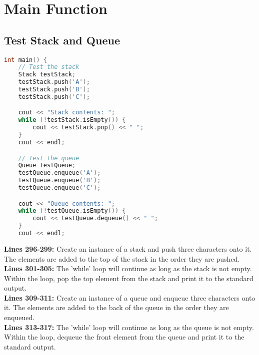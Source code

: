 \documentclass[letterpaper, 10pt,DIV=13]{scrartcl}
\numberwithin{equation}{section} %
\numberwithin{figure}{section} %
\numberwithin{table}{section} %
\begin{document}

\pagebreak

\section{Main Function}
\subsection{Test Stack and Queue}
\begin{linenumbers}
\begin{lstlisting}[language=C++, caption={Test Stack and Queue}, label={code:example}]
int main() {
    // Test the stack
    Stack testStack;
    testStack.push('A');
    testStack.push('B');
    testStack.push('C');

    cout << "Stack contents: ";
    while (!testStack.isEmpty()) {
        cout << testStack.pop() << " ";
    }
    cout << endl;

    // Test the queue
    Queue testQueue;
    testQueue.enqueue('A');
    testQueue.enqueue('B');
    testQueue.enqueue('C');

    cout << "Queue contents: ";
    while (!testQueue.isEmpty()) {
        cout << testQueue.dequeue() << " ";
    }
    cout << endl;
\end{lstlisting}
\end{linenumbers}
\nolinenumbers

\textbf{Lines 296-299:} Create an instance of a stack and push three characters onto it. The elements are added to the top of the stack in the order they are pushed. \\
\textbf{Lines 301-305:} The 'while' loop will continue as long as the stack is not empty. Within the loop, pop the top element from the stack and print it to the standard output. \\
\textbf{Lines 309-311:} Create an instance of a queue and enqueue three characters onto it. The elements are added to the back of the queue in the order they are enqueued. \\
\textbf{Lines 313-317:} The 'while' loop will continue as long as the queue is not empty. Within the loop, dequeue the front element from the queue and print it to the standard output.
\end{document}
